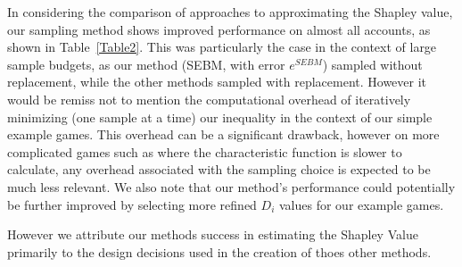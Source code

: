 In considering the comparison of approaches to approximating the Shapley value, our sampling method shows improved performance on almost all accounts, as shown in Table~\ref{Table2}.
This was particularly the case in the context of large sample budgets, as our method (SEBM, with error $e^{SEBM}$) sampled without replacement, while the other methods sampled with replacement. 
However it would be remiss not to mention the computational overhead of iteratively minimizing (one sample at a time) our inequality in the context of our simple example games. 
This overhead can be a significant drawback, however on more complicated games such as where the characteristic function is slower to calculate, any overhead associated with the sampling choice is expected to be much less relevant. 
We also note that our method's performance could potentially be further improved by selecting more refined $D_i$ values for our example games.

However we attribute our methods success in estimating the Shapley Value primarily to the design decisions used in the creation of thoes other methods.

% 


%


